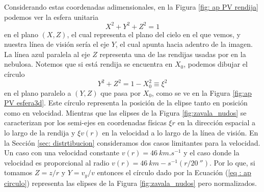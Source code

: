 \documentclass{book}
\begin{document}
Considerando estas coordenadas adimensionales, en la Figura \ref{fig: ap PV rendija} podemos ver la esfera unitaria
\begin{equation}
X^2+Y^2+Z^2=1
\end{equation}
 en el plano $(X,Z)$, el cual representa el plano del cielo en el que vemos, y nuestra línea de visión sería el eje $Y$, el cual apunta hacia adentro de la imagen. La línea azul paralela al eje $Z$ representa una de las rendijas usadas por \cite{Zavala:2022} en  la nebulosa. Notemos que si está rendija se encuentra en $X_0$, podemos dibujar el círculo 
 \begin{equation}\label{eq : ap circulo}
 Y^2+Z^2=1-X_0^2 \equiv \xi^2
 \end{equation}
en el plano paralelo a $(Y,Z)$ que pasa por $X_0$, como se ve en la Figura \ref{fig:ap PV esfera3d}. Este círculo representa la posición de la elipse tanto en posición como en velocidad. Mientras que las elipses de la Figura \ref{fig:zavala_nudos} se caracterizan por los semi-ejes en coordenadas físicas $\xi r$ en la dirección espacial a lo largo de la rendija y $\xi v(r)$ en la velocidad a lo largo de la línea de visión.  En la Sección \ref{sec: distrtibucion} consideramos dos casos limitantes para la velocidad. Un caso con una velocidad constante $v(r)=\SI{46}{km.s^{-1}}$ y el caso donde la velocidad es proporcional al radio $v(r)=\SI{46}{km-s^{-1}}(r/\SI{20}{\arcsecond})$.
Por lo que, si tomamos $Z=z/r$ y $Y=v_y/v$ entonces el círculo dado por la Ecuación (\ref{eq : ap circulo}) representa las elipses de la Figura \ref{fig:zavala_nudos} pero normalizados.
\end{document}
